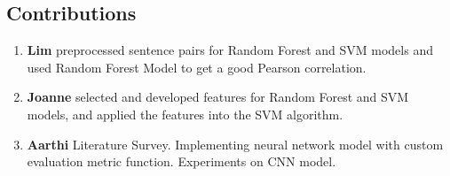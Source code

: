 \documentclass{article} %
\begin{document}
\subsection*{Contributions}
\begin{enumerate}
\item \textbf{Lim}  preprocessed sentence pairs for Random Forest and SVM models and used Random Forest Model to get a good Pearson correlation.
\item \textbf{Joanne} selected and developed features for Random Forest and SVM models, and applied the features into the SVM algorithm.
\item \textbf{Aarthi} Literature Survey. Implementing neural network model with custom evaluation metric function. Experiments on CNN model. 
\end{enumerate}
 
\end{document}
